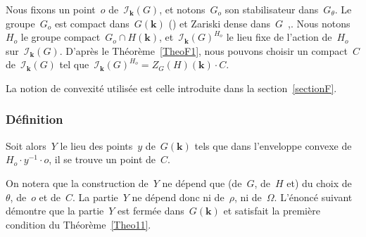 \documentclass[french]{amsart}
\newcommand{\kk}{\mathbf{k}}
\newcommand{\Ik}{\mathscr{I}_\kk}
\begin{document}
Nous fixons un point~$o$ de~$\Ik(G)$, et notons~$G_o$ son stabilisateur dans~$G_\theta$. Le grou\-pe~$G_o$ est compact dans~$G(\kk)$ (\cite[3.2]{Tit79}) et Zariski dense dans~$G$~,\cite[Lemma~1.4]{RTW09}. Nous notons~$H_o$ le groupe compact~$G_o\cap H(\kk)$, et~$\Ik(G)^{H_o}$ le lieu fixe de l'action de~$H_o$ sur~$\Ik(G)$. D'après le Théorème~\ref{TheoF1}, nous pouvons choisir un compact~$C$ de~$\Ik(G)$ tel que~$\Ik(G)^{H_o}=Z_G(H)(\kk)\cdot C$.

La notion de convexité utilisée est celle introduite dans la section~\ref{sectionF}.

\subsubsection*{Définition}\label{Defi Y}
Soit alors~$Y$ le lieu des points~$y$ de~$G(\kk)$ tels que dans l'enveloppe
convexe de~$H_o \cdot y^{-1}\cdot o$, il se trouve un point de~$C$.

On notera que la construction de~$Y$ ne dépend que (de~$G$, de~$H$ et) du choix
de~$\theta$, de~$o$ et de~$C$. La partie~$Y$ ne dépend donc ni de~$\rho$, ni de~$\Omega$. L'énoncé suivant
démontre que la partie~$Y$ est fermée dans~$G(\kk)$ et satisfait la première condition du Théorème~\ref{Theo11}.
\end{document}
